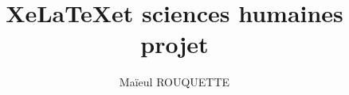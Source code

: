 \documentclass[a4paper,11pt]{book}
\begin{document}
\title{Xe\LaTeX et sciences humaines \\ projet}
\author{Maïeul ROUQUETTE}
\date{}
%
%
%



\end{document}
